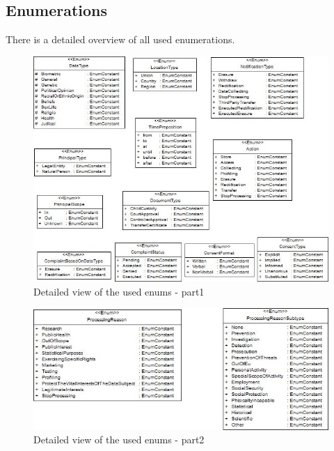 \documentclass[11pt,english]{article}
\begin{document}
\subsection{Enumerations}
There is a detailed overview of all used enumerations.
\begin{figure}[H]
    \centering
    \includegraphics[width=12.5cm]{images/enums1.jpg}
    \caption{Detailed view of the used enums - part1}
    \label{fig:Enums1}
\end{figure}
\begin{figure}[H]
    \centering
    \includegraphics[width=12.5cm]{images/enums2.jpg}
    \caption{Detailed view of the used enums - part2}
    \label{fig:Enums2}
\end{figure}
\end{document}
